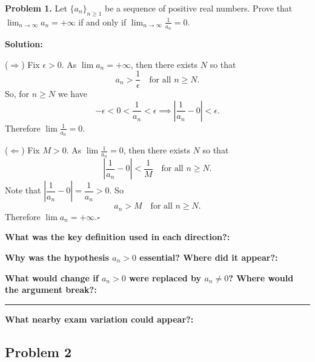 \documentclass[12pt]{article}
\newcommand{\fillfield}[1]{%
  \par\noindent\textbf{#1:}\enspace\hrulefill\par\vspace{3pt}%
}
\newcommand{\fillfieldlong}[1]{%
  \par\noindent\textbf{#1:}\par\vspace{1.5cm}%
  \noindent\rule{\linewidth}{0.35pt}\par\vspace{4pt}%
}
\begin{document}
\begin{tcolorbox}[
  enhanced, breakable,
  colback  = solgreen,
  colframe = green!45!black,
  fonttitle = \bfseries,
  title = {\textsc{Official Solution}\hfill Homework 5 -- Selected Solutions}
]
\textbf{Problem 1.}
Let $\{a_n\}_{n \geq 1}$ be a sequence of positive real numbers.
Prove that $\lim_{n \to \infty} a_n = +\infty$ if and only if
$\lim_{n \to \infty} \frac{1}{a_n} = 0$.

\medskip
\textbf{Solution:}

\medskip
($\Rightarrow$)
Fix $\epsilon > 0$.
As $\lim a_n = +\infty$, then there exists $N$ so that
\[
  a_n > \frac{1}{\epsilon} \quad \text{for all } n \geq N.
\]
So, for $n \geq N$ we have
\[
  -\epsilon < 0 < \frac{1}{a_n} < \epsilon
  \implies
  \left|\frac{1}{a_n} - 0\right| < \epsilon.
\]
Therefore $\displaystyle\lim \frac{1}{a_n} = 0$.

\medskip
($\Leftarrow$)
Fix $M > 0$.
As $\displaystyle\lim \frac{1}{a_n} = 0$, then there exists $N$ so that
\[
  \left|\frac{1}{a_n} - 0\right| < \frac{1}{M} \quad \text{for all } n \geq N.
\]
Note that $\left|\dfrac{1}{a_n} - 0\right| = \dfrac{1}{a_n} > 0$.
So
\[
  a_n > M \quad \text{for all } n \geq N.
\]
Therefore $\lim a_n = +\infty$.\hfill$\square$
\end{tcolorbox}

\bigskip

\begin{tcolorbox}[
  enhanced, breakable,
  colback  = reflectcyan,
  colframe = cyan!55!black,
  fonttitle = \bfseries,
  title = {\textsc{Reflection \& Variation}}
]
\fillfield{What was the key definition used in each direction?}
\fillfield{Why was the hypothesis $a_n > 0$ essential? Where did it appear?}
\fillfieldlong{%
  What would change if $a_n > 0$ were replaced by $a_n \neq 0$?
  Where would the argument break?}
\fillfield{What nearby exam variation could appear?}
\end{tcolorbox}


\newpage
\subsection{Problem 2}
\end{document}

